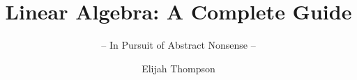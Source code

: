 \documentclass[graybox,envcountchap,sectrefs]{style/svmono}
\begin{document}
\author{Elijah Thompson}
\title{Linear Algebra: A Complete Guide}
\subtitle{-- In Pursuit of Abstract Nonsense --}
\maketitle

\frontmatter%

%
%

%

\tableofcontents

%


\mainmatter%
















\backmatter%
%
%
%
\printindex

\end{document}
